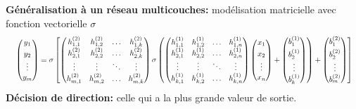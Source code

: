 \documentclass[10pt]{beamer}
\begin{document}
\begin{frame}
\begin{columns}[T]
\begin{column}{0.60\textwidth}
  \vspace{-0.4cm}
  \textbf{Généralisation à un réseau multicouches:} modélisation matricielle avec fonction vectorielle $\sigma$
  \begin{equation*}
  \resizebox{\textwidth}{!}{
  $\begin{pmatrix}
  y_{1} \\[0.3em]
  y_{2} \\
  \vdots \\
  y_{m}
  \end{pmatrix}
  =
  \sigma\left[
  \begin{pmatrix}
  h^{(2)}_{1,1} & h^{(2)}_{1,2} & \ldots & h^{(2)}_{1,k} \\
  h^{(2)}_{2,1} & h^{(2)}_{2,2} & \ldots & h^{(2)}_{2,k} \\
  \vdots & \vdots & \ddots & \vdots \\
  h^{(2)}_{m,1} & h^{(2)}_{m,2} & \ldots & h^{(2)}_{m,k}
  \end{pmatrix}
  \sigma\left(
  \begin{pmatrix}
  h^{(1)}_{1,1} & h^{(1)}_{1,2} & \ldots & h^{(1)}_{1,n} \\
  h^{(1)}_{2,1} & h^{(1)}_{2,2} & \ldots & h^{(1)}_{2,n} \\
  \vdots & \vdots & \ddots & \vdots \\
  h^{(1)}_{k,1} & h^{(1)}_{k,2} & \ldots & h^{(1)}_{k,n}
  \end{pmatrix}
  \begin{pmatrix}
  x_{1} \\[0.3em]
  x_{2} \\
  \vdots \\
  x_{n}
  \end{pmatrix}
  +
  \begin{pmatrix}
  b_{1}^{(1)} \\[0.3em]
  b_{2}^{(1)} \\
  \vdots \\
  b_{k}^{(1)}
  \end{pmatrix}
  \right)
  +
  \begin{pmatrix}
  b_{1}^{(2)} \\[0.3em]
  b_{2}^{(2)} \\
  \vdots \\
  b_{m}^{(2)}
  \end{pmatrix}
  \right]
  $}
  \end{equation*}
  \textbf{Décision de direction:} celle qui a la plus grande valeur de sortie.


\end{column}
\end{columns}
\end{frame}
\end{document}
